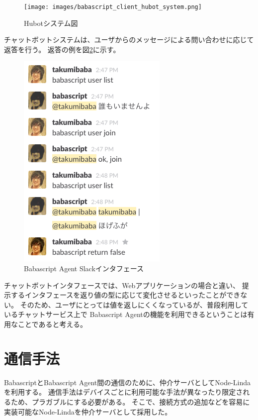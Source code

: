 \begin{figure}[htbp]
  \begin{center}
  \texttt{[image: images/babascript\_client\_hubot\_system.png]}
  \end{center}
  \caption{Hubotシステム図}
  \label{fig:babascript_client_hubot_system}
\end{figure}

チャットボットシステムは、ユーザからのメッセージによる問い合わせに応じて返答を行う。
返答の例を図\ref{fig:babascript_client_slack}に示す。

\begin{figure}[htbp]
  \begin{center}
  \includegraphics[width=.4\linewidth,bb=0 0 273 402]{images/babascript_client_slack.png}
  \end{center}
  \caption{Babascript Agent Slackインタフェース}
  \label{fig:babascript_client_slack}
\end{figure}

チャットボットインタフェースでは、Webアプリケーションの場合と違い、
提示するインタフェースを返り値の型に応じて変化させるといったことができない。
そのため、ユーザにとっては値を返しにくくなっているが、普段利用しているチャットサービス上で
Babascript Agentの機能を利用できるということは有用なことであると考える。

\section{通信手法}\label{ux901aux4fe1ux624bux6cd5}

BabascriptとBabascript
Agent間の通信のために、仲介サーバとしてNode-Linda\cite{node-linda}を利用する。
通信手法はデバイスごとに利用可能な手法が異なったり限定されるため、プラガブルにする必要がある。
そこで、接続方式の追加などを容易に実装可能なNode-Lindaを仲介サーバとして採用した。

